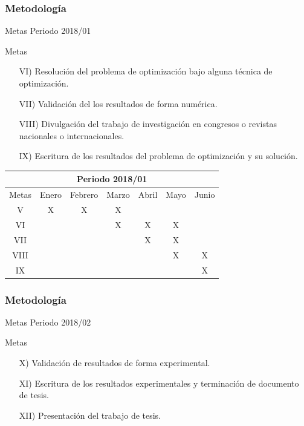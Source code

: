 {{{{\subsubsection{Metodología} 
\begin{frame}[shrink=20]{Metas Periodo 2018/01}
	\begin{block}{Metas} 			
		\justifying		
		\begin{itemize}
			\item [VI)] Resolución del problema de optimización bajo alguna técnica de optimización.
			\item [VII)] Validación del los resultados de forma numérica.
			\item [VIII)] Divulgación del trabajo de investigación en congresos o revistas nacionales o internacionales.  
			\item [IX)] Escritura de los resultados del problema de optimización y su solución.
		\end{itemize}
	\end{block}
	\begin{table}[H]
		\centering
		\begin{tabular}{|c|c|c|c|c|c|c|}
			\hline
			\multicolumn{7}{|c|}{Periodo 2018/01}\\\hline\hline
			Metas 	& Enero & Febrero 	& Marzo & Abril & Mayo	& Junio \\\hline
			V 		& X 	& X 		& X 	& 	 	&  		& 		\\\hline
			VI 		& 	 	& 			& X	 	& X 	& X 	& 		\\\hline
			VII		& 		& 			&		& X		& X		& 		\\\hline
			VIII	&		&			&		& 		& X		& X		\\\hline
			IX		&		&			&		&		&		& X		\\\hline
		\end{tabular}
	\end{table}
\end{frame}

\subsubsection{Metodología} 
\begin{frame}[shrink=20]{Metas Periodo 2018/02}
	\begin{block}{Metas} 			
		\justifying		
		\begin{itemize}
			\item [X)] Validación de resultados de forma experimental.
			\item [XI)] Escritura de los resultados experimentales y terminación de documento de tesis.
			\item [XII)] Presentación del trabajo de tesis.
		\end{itemize}
	\end{block}
	

\end{frame}}}}}
